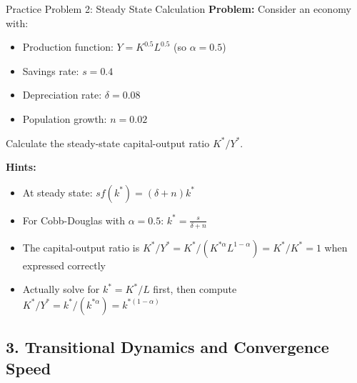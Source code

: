 \begin{frame}{Practice Problem 2: Steady State Calculation}
\textbf{Problem:} Consider an economy with:
\begin{itemize}
\item Production function: $Y = K^{0.5} L^{0.5}$ (so $\alpha = 0.5$)
\item Savings rate: $s = 0.4$
\item Depreciation rate: $\delta = 0.08$
\item Population growth: $n = 0.02$
\end{itemize}
Calculate the steady-state capital-output ratio $K^*/Y^*$.

\bigskip
\textbf{Hints:}
\begin{itemize}
\item At steady state: $sf(k^*) = (\delta + n)k^*$
\item For Cobb-Douglas with $\alpha = 0.5$: $k^* = \frac{s}{\delta + n}$
\item The capital-output ratio is $K^*/Y^* = K^*/(K^{*\alpha}L^{1-\alpha}) = K^*/K^* = 1$ when expressed correctly
\item Actually solve for $k^* = K^*/L$ first, then compute $K^*/Y^* = k^*/(k^{*\alpha}) = k^{*(1-\alpha)}$
\end{itemize}

\end{frame}

\subsection{3. Transitional Dynamics and Convergence Speed}

